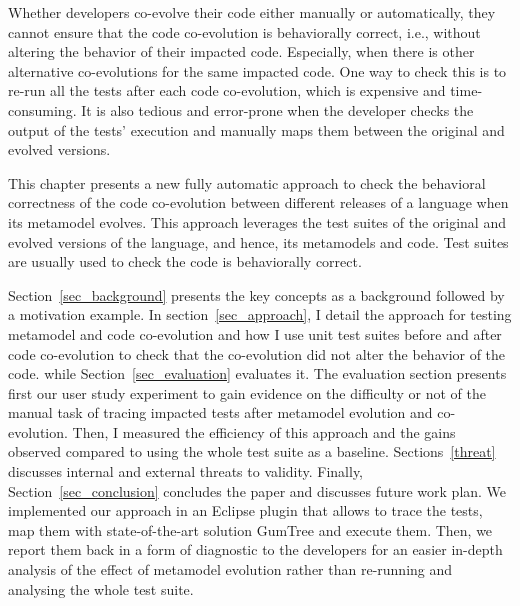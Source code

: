
Whether developers co-evolve their code either manually or automatically, they cannot ensure that the code co-evolution is behaviorally correct, i.e., without altering the behavior of their impacted code. Especially, when there is other alternative co-evolutions for the same impacted code. 
One way to check this is to re-run all the tests after each code co-evolution, which is expensive and time-consuming. It is also tedious and error-prone when the developer checks the output of the tests' execution and manually maps them between the original and evolved versions.

This chapter presents a new fully automatic approach to check the behavioral correctness of the code co-evolution between different releases of a language when its metamodel evolves. This approach leverages the test suites of the original and evolved versions of the language, and hence, its metamodels and code. Test suites are usually used to check the code is behaviorally correct. 

Section~\ref{sec_background} presents the key concepts as a background followed by a motivation example. 
In section~\ref{sec_approach}, I detail the approach for testing metamodel and code co-evolution and how I use unit test suites before and after code co-evolution to check that the co-evolution did not alter the behavior of the code. while Section~\ref{sec_evaluation} evaluates it. The evaluation section presents first our user study experiment to gain evidence on the difficulty or not of the manual task of tracing impacted tests after metamodel evolution and co-evolution. Then, I measured the efficiency of this approach and the gains observed compared to using the whole test suite as a baseline.
Sections~\ref{threat} discusses internal and external threats to validity. 
Finally, Section~\ref{sec_conclusion} concludes the paper and discusses future work plan. 
%
We implemented our approach in an Eclipse plugin that allows to trace the tests, map them with state-of-the-art solution GumTree \cite{falleri2014fine} and execute them. Then, we report them back in a form of diagnostic to the developers for an easier in-depth analysis of the effect of metamodel evolution rather than re-running and analysing the whole test suite.


